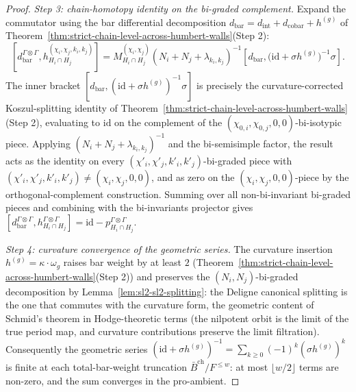 \begin{proof}
\emph{Step 3: chain-homotopy identity on the bi-graded complement.}
Expand the commutator using the bar differential decomposition
$d_{\mathrm{bar}}=d_{\mathrm{int}}+d_{\mathrm{cobar}}+h^{(g)}$ of
Theorem~\textup{\ref{thm:strict-chain-level-across-humbert-walls}}(Step 2):
\[
[d^{\Gamma\otimes\Gamma}_{\mathrm{bar}},
h^{(\chi_i,\chi_j,k_i,k_j)}_{H_i\cap H_j}]
=
M^{(\chi_i,\chi_j)}_{H_i\cap H_j}
(N_i+N_j+\lambda_{k_i,k_j})^{-1}
[d_{\mathrm{bar}},
\bigl(\mathrm{id}+\sigma h^{(g)}\bigr)^{-1}\sigma].
\]
The inner bracket
$[d_{\mathrm{bar}},(\mathrm{id}+\sigma h^{(g)})^{-1}\sigma]$ is
precisely the curvature-corrected Koszul-splitting identity of
Theorem~\textup{\ref{thm:strict-chain-level-across-humbert-walls}}(Step 2),
evaluating to $\mathrm{id}$ on the complement of the
$(\chi_{0,i},\chi_{0,j},0,0)$-bi-isotypic piece. Applying
$(N_i+N_j+\lambda_{k_i,k_j})^{-1}$ and the bi-semisimple factor, the
result acts as the identity on every
$(\chi'_i,\chi'_j,k'_i,k'_j)$-bi-graded piece with
$(\chi'_i,\chi'_j,k'_i,k'_j)\neq(\chi_i,\chi_j,0,0)$, and as zero on
the $(\chi_i,\chi_j,0,0)$-piece by the orthogonal-complement
construction. Summing over all non-bi-invariant bi-graded pieces and
combining with the bi-invariants projector gives
$[d^{\Gamma\otimes\Gamma}_{\mathrm{bar}},h^{\Gamma\otimes\Gamma}_{H_i\cap H_j}]
= \mathrm{id} - p^{\Gamma\otimes\Gamma}_{H_i\cap H_j}$.

\emph{Step 4: curvature convergence of the geometric series.} The
curvature insertion $h^{(g)}=\kappa\cdot\omega_g$ raises bar weight
by at least $2$ (Theorem~\textup{\ref{thm:strict-chain-level-across-humbert-walls}}(Step 2))
and preserves the $(N_i,N_j)$-bi-graded decomposition by
Lemma~\textup{\ref{lem:sl2-sl2-splitting}}: the Deligne canonical
splitting is the one that commutes with the curvature form, the
geometric content of Schmid's theorem in Hodge-theoretic terms
(the nilpotent orbit is the limit of the true period map, and
curvature contributions preserve the limit filtration). Consequently
the geometric series
$(\mathrm{id}+\sigma h^{(g)})^{-1}=\sum_{k\geq 0}(-1)^k(\sigma h^{(g)})^k$
is finite at each total-bar-weight truncation
$\bar B^{\mathrm{ch}}/F^{\leq w}$: at most $\lfloor w/2\rfloor$ terms
are non-zero, and the sum converges in the pro-ambient.


\end{proof}

